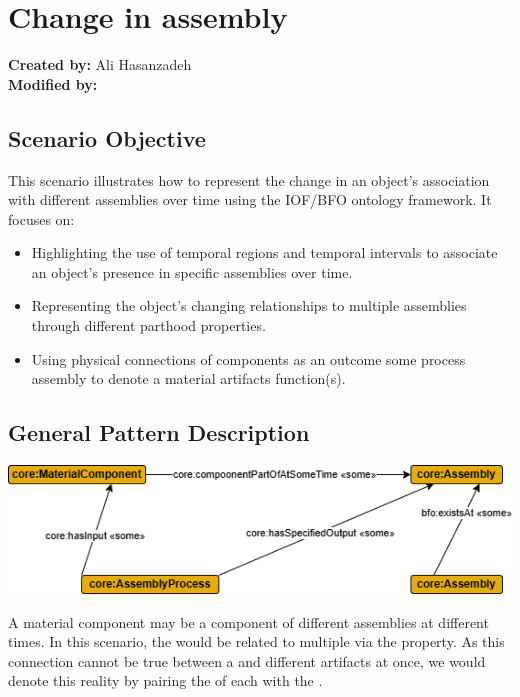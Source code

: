 \section{Change in assembly}

\textbf{Created by:} Ali Hasanzadeh \\
\textbf{Modified by:}  \\

\subsection*{Scenario Objective}

This scenario illustrates how to represent the change in an object's association with different assemblies over time using the IOF/BFO ontology framework. It focuses on:
\begin{itemize}
    \item Highlighting the use of temporal regions and temporal intervals to associate an object's presence in specific assemblies over time.
    \item Representing the object's changing relationships to multiple assemblies through different parthood properties.
    \item Using physical connections of components as an outcome some process assembly to denote a material artifacts function(s). 
\end{itemize}

\subsection*{General Pattern Description}

\includegraphics[scale=0.48]{scenarios/assemblies-components/images/assembly-component-general-pattern-description.png}

A material component may be a component of different assemblies at different times. In this scenario, the  would be related to multiple  via the  property. As this connection cannot be true between a  and different  artifacts at once, we would denote this reality by pairing the  of each  with the .

